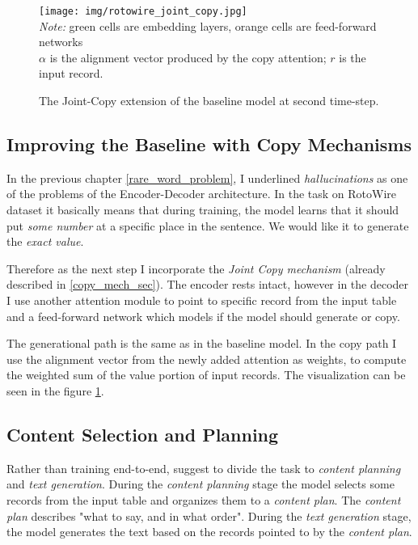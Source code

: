 \begin{figure}[!h]
    \centering
    \texttt{[image: img/rotowire\_joint\_copy.jpg]}
    \footnotesize{\\ \textit{Note:} green cells are embedding layers, orange cells are feed-forward networks \\ $\alpha$ is the alignment vector produced by the copy attention; $r$ is the input record.}
    \caption{\centering The Joint-Copy extension of the baseline model at second time-step.} \label{rotowire_joint_copy_vis}
\end{figure}

\subsection{Improving the Baseline with Copy Mechanisms}

In the previous chapter \ref{rare_word_problem}, I underlined \emph{hallucinations} as one of the problems of the Encoder-Decoder architecture. In the task on RotoWire dataset it basically means that during training, the model learns that it should put \emph{some number} at a specific place in the sentence. We would like it to generate the \emph{exact value}.

Therefore as the next step I incorporate the \emph{Joint Copy mechanism} \citep{gu2016incorporating} (already described in \ref{copy_mech_sec}). The encoder rests intact, however in the decoder I use another attention module to point to specific record from the input table and a feed-forward network which models if the model should generate or copy.

The generational path is the same as in the baseline model. In the copy path I use the alignment vector from the newly added attention as weights, to compute the weighted sum of the value portion of input records. The visualization can be seen in the figure \ref{rotowire_joint_copy_vis}.

\subsection{Content Selection and Planning}

Rather than training end-to-end, \citep{puduppully2019datatotext} suggest to divide the task to \emph{content planning} and \emph{text generation}. During the \emph{content planning} stage the model selects some records from the input table and organizes them to a \emph{content plan}. The \emph{content plan} describes "what to say, and in what order". During the \emph{text generation} stage, the model generates the text based on the records pointed to by the \emph{content plan}.


